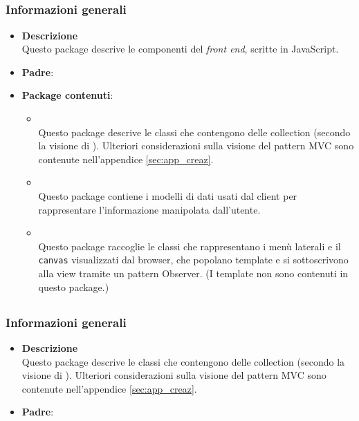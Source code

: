 


\subsection{}
\label{\nogloxy{swedesigner::client}}
\subsubsection{Informazioni generali}
\begin{itemize}
\item \textbf{Descrizione}\\
Questo package descrive le componenti del \emph{front end}, scritte in JavaScript.
\item \textbf{Padre}: \hyperref[\nogloxy{swedesigner}]{}
\item \textbf{Package contenuti}:
\begin{itemize}
\item \hyperref[\nogloxy{swedesigner::client::collection}]{}\\
Questo package descrive le classi che contengono delle collection (secondo la visione di \backbonejs). Ulteriori considerazioni sulla visione del pattern MVC sono contenute nell'appendice \ref{sec:app_creaz}.
\item \hyperref[\nogloxy{swedesigner::client::model}]{}\\
Questo package contiene i modelli di dati usati dal client per rappresentare l'informazione manipolata dall'utente.
\item \hyperref[\nogloxy{swedesigner::client::view}]{}\\
Questo package raccoglie le classi che rappresentano i menù laterali e il \texttt{canvas} visualizzati dal browser, che popolano template e si sottoscrivono alla view tramite un pattern Observer. (I template non sono contenuti in questo package.)
\end{itemize}
\end{itemize}

\subsection{}
\label{\nogloxy{swedesigner::client::collection}}
\subsubsection{Informazioni generali}
\begin{itemize}
\item \textbf{Descrizione}\\
Questo package descrive le classi che contengono delle collection (secondo la visione di \backbonejs). Ulteriori considerazioni sulla visione del pattern MVC sono contenute nell'appendice \ref{sec:app_creaz}.
\item \textbf{Padre}: \hyperref[\nogloxy{swedesigner::client}]{}
\end{itemize}

